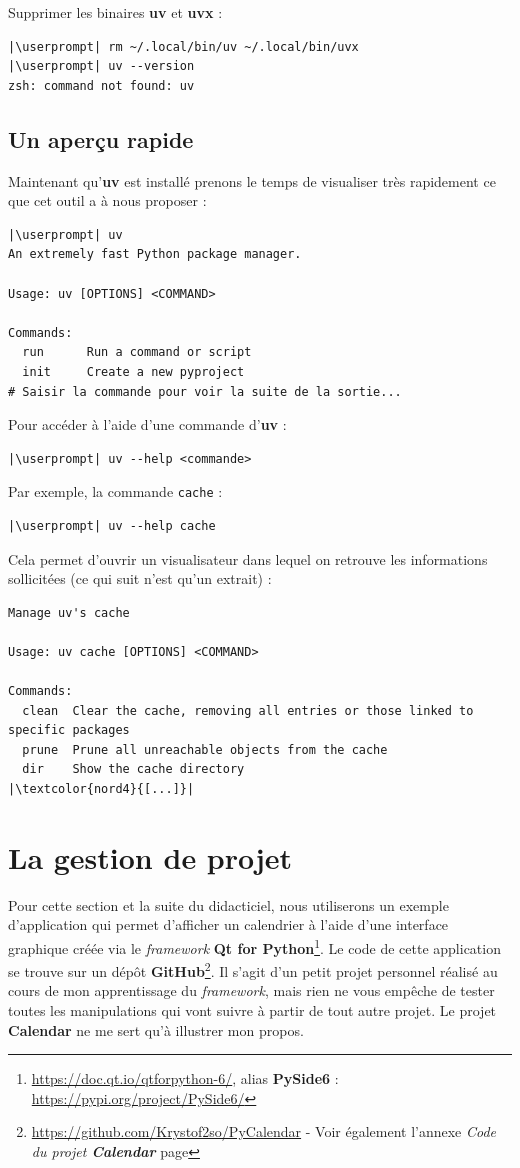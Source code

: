Supprimer les binaires \textbf{uv} et \textbf{uvx} :
\begin{lstlisting}[style=bash]
|\userprompt| rm ~/.local/bin/uv ~/.local/bin/uvx
|\userprompt| uv --version
zsh: command not found: uv
\end{lstlisting}

\subsection*{Un aperçu rapide}
Maintenant qu'\textbf{uv} est installé prenons le temps de visualiser très rapidement ce que cet outil a à nous proposer :
\begin{lstlisting}[style=bash]
|\userprompt| uv
An extremely fast Python package manager.

Usage: uv [OPTIONS] <COMMAND>

Commands:
  run      Run a command or script
  init     Create a new pyproject
# Saisir la commande pour voir la suite de la sortie...
\end{lstlisting}

Pour accéder à l'aide d'une commande d'\textbf{uv} :
\begin{lstlisting}[style=bash]
|\userprompt| uv --help <commande>
\end{lstlisting}

Par exemple, la commande \texttt{cache} :
\begin{lstlisting}[style=bash]
|\userprompt| uv --help cache
\end{lstlisting}

Cela permet d'ouvrir un visualisateur dans lequel on retrouve les informations sollicitées (ce qui suit n'est qu'un extrait) :
\begin{lstlisting}[style=visual]
Manage uv's cache

Usage: uv cache [OPTIONS] <COMMAND>

Commands:
  clean  Clear the cache, removing all entries or those linked to specific packages
  prune  Prune all unreachable objects from the cache
  dir    Show the cache directory
|\textcolor{nord4}{[...]}|
\end{lstlisting}

\section{La gestion de projet}
Pour cette section et la suite du didacticiel, nous utiliserons un exemple d'application qui permet d'afficher un calendrier à l'aide d'une interface graphique créée via le \textit{framework} \textbf{Qt for Python}\footnote{\url{https://doc.qt.io/qtforpython-6/}, alias \textbf{PySide6} : \url{https://pypi.org/project/PySide6/}}. Le code de cette application se trouve sur un dépôt \textbf{GitHub}\footnote{\url{https://github.com/Krystof2so/PyCalendar} - Voir également l'annexe \textit{Code du projet \textbf{Calendar}} page \pageref{code_calendar}}. Il s'agit d'un petit projet personnel réalisé au cours de mon apprentissage du \textit{framework}, mais rien ne vous empêche de tester toutes les manipulations qui vont suivre à partir de tout autre projet. Le projet \textbf{Calendar} ne me sert qu'à illustrer mon propos.

